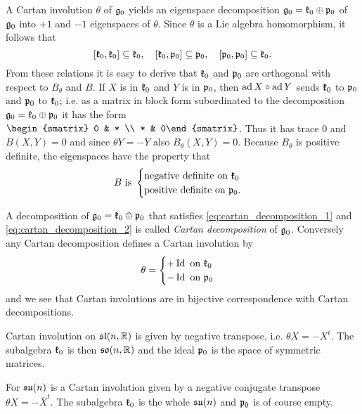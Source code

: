 A Cartan involution $\theta$ of $\mathfrak{g}_0$ yields an eigenspace decomposition $\mathfrak{g}_0 = \mathfrak{k}_0 \oplus \mathfrak{p}_0$ of $\mathfrak{g}_0$ into $+1$ and $-1$ eigenspaces of $\theta$. Since $\theta$ is a Lie algebra homomorphism, it follows that
\begin{equation}\label{eq:cartan_decomposition_1}
 [\mathfrak{k}_0,\mathfrak{k}_0] \subseteq \mathfrak{k}_0, \quad[\mathfrak{k}_0,\mathfrak{p}_0] \subseteq \mathfrak{p}_0, \quad [\mathfrak{p}_0,\mathfrak{p}_0] \subseteq \mathfrak{k}_0.
\end{equation}
From these relations it is easy to derive that $\mathfrak{k}_0$ and $\mathfrak{p}_0$ are orthogonal with respect to $B_\theta$ and $B$. If $X$ is in $\mathfrak{k}_0$ and $Y$ is in $\mathfrak{p}_0$, then $\operatorname{\mathrm{ad}} X \circ \operatorname{\mathrm{ad}} Y $ sends $\mathfrak{k}_0$ to $\mathfrak{p}_0$ and $\mathfrak{p}_0$ to $\mathfrak{k}_0$; i.e. as a matrix in block form subordinated to the decomposition $\mathfrak{g}_0 = \mathfrak{k}_0 \oplus \mathfrak{p}_0$ it has the form $\begin{smatrix} 0 & * \\ * & 0\end{smatrix}$. Thus it has trace $0$ and $B(X,Y) = 0$ and since $\theta Y = - Y$ also $B_\theta (X,Y) = 0$. Because $B_\theta$ is positive definite, the eigenspaces have the property that
\begin{equation}\label{eq:cartan_decomposition_2}
 B \text{ is } \begin{cases} \text{negative definite on } \mathfrak{k}_0 \\ \text{positive definite on } \mathfrak{p}_0. \end{cases}
\end{equation}

A decomposition of $\mathfrak{g}_0 = \mathfrak{k}_0 \oplus \mathfrak{p}_0$ that satisfies \eqref{eq:cartan_decomposition_1} and \eqref{eq:cartan_decomposition_2} is called \emph{Cartan decomposition} of $\mathfrak{g}_0$. Conversely any Cartan decomposition defines a Cartan involution by
\[
\theta =
 \begin{cases}
  + \operatorname{\mathrm{Id}} \text{ on } \mathfrak{k}_0 \\
  - \operatorname{\mathrm{Id}} \text{ on } \mathfrak{p}_0
 \end{cases}
\]
and we see that Cartan involutions are in bijective correspondence with Cartan decompositions.


\begin{example}
  Cartan involution on $\mathfrak{sl}(n,\mathbb{R})$ is given by negative transpose, i.e. $\theta X = - X^t$. The subalgebra $\mathfrak{k}_0$ is then $\mathfrak{so}(n,\mathbb{R})$ and the ideal $\mathfrak{p}_0$ is the space of symmetric matrices.

 For $\mathfrak{su}(n)$ is a Cartan involution given by a negative conjugate transpose $\theta X = - \overline{X}^t$. The subalgebra $\mathfrak{k}_0$ is the whole $\mathfrak{su}(n)$ and $\mathfrak{p}_0$ is of course empty.
\end{example}

